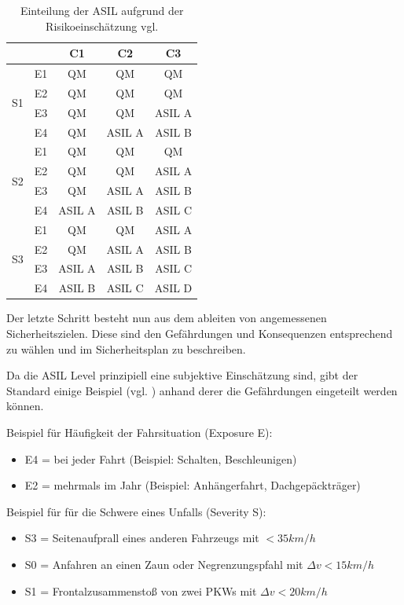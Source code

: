\documentclass[a4paper,DIV=calc,ngerman]{scrartcl}
\begin{document}
\begin{table}[h]
\center
\begin{tabular}[h]{c c | c c c}
\toprule
 &  & C1 & C2 & C3\\
\midrule
\multirow{4}{*}{S1} & E1 & QM & QM & QM\\
 & E2 & QM & QM & QM\\
 & E3 & QM & QM & ASIL A\\
 & E4 & QM & ASIL A & ASIL B\\
\midrule
\multirow{4}{*}{S2} & E1 & QM & QM & QM\\
 & E2 & QM & QM & ASIL A\\
 & E3 & QM & ASIL A & ASIL B\\
 & E4 & ASIL A & ASIL B & ASIL C\\
\midrule
\multirow{4}{*}{S3} & E1 & QM & QM & ASIL A\\
 & E2 & QM & ASIL A & ASIL B\\
 & E3 & ASIL A & ASIL B & ASIL C\\
 & E4 & ASIL B & ASIL C & ASIL D\\
\bottomrule
\end{tabular}
\caption{Einteilung der ASIL aufgrund der Risikoeinschätzung vgl. \cite[S. 125]{1}}
\label{tab:asil}
\end{table}

Der letzte Schritt besteht nun aus dem ableiten von angemessenen Sicherheitszielen. Diese sind den Gefährdungen und Konsequenzen entsprechend zu wählen und im Sicherheitsplan zu beschreiben.

Da die ASIL Level prinzipiell eine subjektive Einschätzung sind, gibt der Standard einige Beispiel (vgl. \cite[S. 125]{1}) anhand derer die Gefährdungen eingeteilt werden können.

Beispiel für Häufigkeit der Fahrsituation (Exposure E):
\begin{itemize}
    \item E4 = bei jeder Fahrt (Beispiel: Schalten, Beschleunigen)
    \item E2 = mehrmals im Jahr (Beispiel: Anhängerfahrt, Dachgepäckträger)
\end{itemize}

Beispiel für für die Schwere eines Unfalls (Severity S):
\begin{itemize}
    \item S3 = Seitenaufprall eines anderen Fahrzeugs mit $ < 35 km/h $
    \item S0 = Anfahren an einen Zaun oder Negrenzungspfahl mit $ \Delta v < 15 km/h $
    \item S1 = Frontalzusammenstoß von zwei PKWs mit $ \Delta v < 20 km/h $
\end{itemize}
\end{document}
